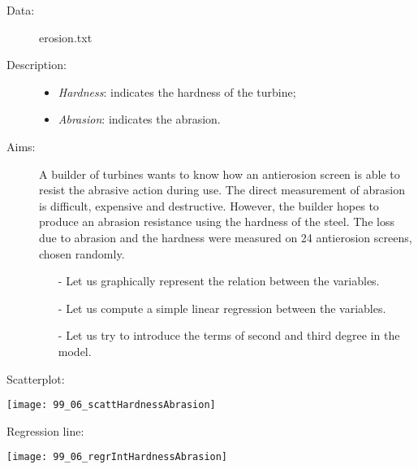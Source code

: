 \begin{frame}
  \begin{description}
    \item[Data: ]erosion.txt \\ 
    \item[Description: ]
      \begin{footnotesize}
        \begin{itemize}
	  \item \textit{Hardness}: indicates the hardness of the turbine;
          \item \textit{Abrasion}: indicates the abrasion.
        \end{itemize}
      \end{footnotesize}
    \item[Aims: ]
      \begin{footnotesize}
        A builder of turbines wants to know how an antierosion screen is able to resist the abrasive action during use. The direct measurement of abrasion is difficult, expensive and destructive. However, the builder hopes to produce an abrasion resistance using the hardness of the steel. The loss due to abrasion and the hardness were measured on 24 antierosion screens, chosen randomly.   
        \begin{itemize}
          \item[-] Let us graphically represent the relation between the variables.
          \item[-] Let us compute a simple linear regression between the variables.
          \item[-] Let us try to introduce the terms of second and third degree in the model.
        \end{itemize}
      \end{footnotesize}
  \end{description}
\end{frame}

\begin{frame}
  Scatterplot:\\
  \vspace{.3cm}
  \begin{center}
    \texttt{[image: 99\_06\_scattHardnessAbrasion]}
  \end{center}
\end{frame}

\begin{frame}
  Regression line:\\
  \vspace{.3cm}
  \begin{center}
    \texttt{[image: 99\_06\_regrIntHardnessAbrasion]}
  \end{center}
\end{frame}

